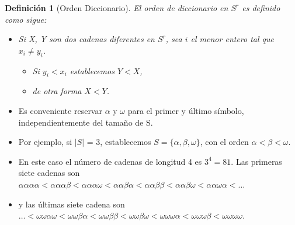 \documentclass{beamer}
\theoremstyle{plain}
\newtheorem{definicion} [Definicion]{Definición}
\theoremstyle{example}
\theoremstyle{example}
\begin{document}
\begin{frame}  \small 

\begin{definicion}[Orden Diccionario]

El orden de diccionario en $S^r$ es definido como sigue:

\begin{itemize}
\item  Si X, Y son dos cadenas diferentes  en $S^r$, sea $i$ el menor entero tal que $x_i \neq y_i$.
\begin{itemize}

\item Si $y_i < x_i$ establecemos $Y < X$, 
\item de otra forma $ X < Y$.
\end{itemize} 
\end{itemize} 

\end{definicion}

\footnotesize 

\begin{itemize}
\item Es conveniente reservar $\alpha$ y $\omega$ para el primer y último símbolo, independientemente del tamaño de S. 

\item Por ejemplo, si $|S|$ = 3, establecemos $S = \{\alpha,\beta,\omega\}$, con  el orden $\alpha < \beta < \omega$. 

\item En este caso el número de cadenas de longitud 4 es $3^4=81$. Las primeras siete cadenas son \\

$\alpha\alpha\alpha\alpha < \alpha\alpha\alpha\beta < \alpha\alpha\alpha\omega < \alpha\alpha\beta\alpha < \alpha\alpha\beta\beta <  \alpha\alpha\beta\omega < \alpha\alpha\omega\alpha < \ldots $\\

\item y las últimas siete cadena son\\

$ \ldots < \omega\omega\alpha\omega < \omega\omega\beta\alpha < \omega\omega\beta\beta < \omega\omega\beta\omega < \omega\omega\omega\alpha  < \omega\omega\omega\beta < \omega\omega\omega\omega.$\\
\end{itemize} 


\end{frame} 
\end{document}
